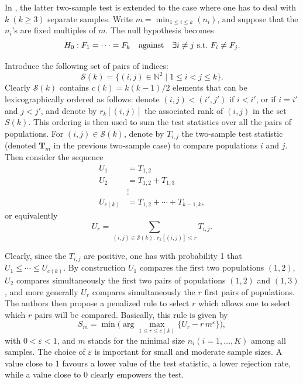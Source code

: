 In \citet{Milhaud+Pommeret+Salhi+Vandekerkhove:2024b}, the latter two-sample test is extended to the case where one has to deal with \(k \; (k \geq 3)\) separate samples. Write \(m = \min_{1\leq i \leq k}(n_i)\), and suppose that the \(n_i\)'s are fixed multiples of \(m\). The null hypothesis becomes
\begin{equation}
  H_0: F_1=\cdots = F_k \quad \text{against} \quad \exists i\neq j {\rm \ s.t.  \ }  F_i \neq F_j.
\label{eq:Ksample-test}
\end{equation}

Introduce the following set of pairs of indices:
\[
\mathcal{S}(k) = \{(i,j) \in \mathbb{N}^2 \;|\; 1 \leq i < j \leq k\}.
\]
Clearly \(\mathcal{S}(k)\) contains \(c(k)=k(k-1)/2\) elements that can be lexicographically ordered as follows: denote \((i,j) < (i',j')\) if \(i<i'\), or if \(i=i'\) and \(j<j'\), and denote by \(r_k[(i,j)]\) the associated rank of \((i,j)\) in the set \(S(k)\). This ordering is then used to sum the test statistics over all the pairs of populations. For \((i,j) \in \mathcal{S}(k)\), denote by \(T_{i,j}\) the two-sample test statistic (denoted \(\mathbf{T}_m\) in the previous two-sample case) to compare populations \(i\) and \(j\). Then consider the sequence
\[
  \begin{aligned}
        U_1 &= T_{1,2} \\
        U_2 &= T_{1,2} + T_{1,3} \\
        &\vdots \\
        U_{c(k)} &= T_{1,2} + \cdots + T_{k-1,k},
  \end{aligned}
\]
or equivalently
\begin{equation}
      U_r = \sum_{(i,j) \in \mathcal{S}(k): \, r_k[(i,j)] \leq r} T_{i,j}.
\label{eq:statU}
\end{equation}

Clearly, since the \(T_{i,j}\) are positive, one has with probability 1 that \(U_1 \leq \cdots \leq U_{c(k)}\). By construction \(U_1\) compares the first two populations \((1,2)\), \(U_2\) compares simultaneously the first two pairs of populations \((1,2)\) and \((1,3)\), and more generally \(U_r\) compares simultaneously the \(r\) first pairs of populations. The authors then propose a penalized rule to select \(r\) which allows one to select which \(r\) pairs will be compared. Basically, this rule is given by
\begin{equation}
        S_m = \min \Biggl( \arg\max_{1 \leq r \leq c(k)} \{ U_r - r \, m^{\varepsilon} \} \Biggr),
\label{eq:selectRankTestStat}
\end{equation}
with \(0 < \varepsilon < 1\), and \(m\) stands for the minimal size \(n_i (i=1,\dots,K)\) among all samples. The choice of \(\varepsilon\) is important for small and moderate sample sizes. A value close to 1 favours a lower value of the test statistic, a lower rejection rate, while a value close to 0 clearly empowers the test.

